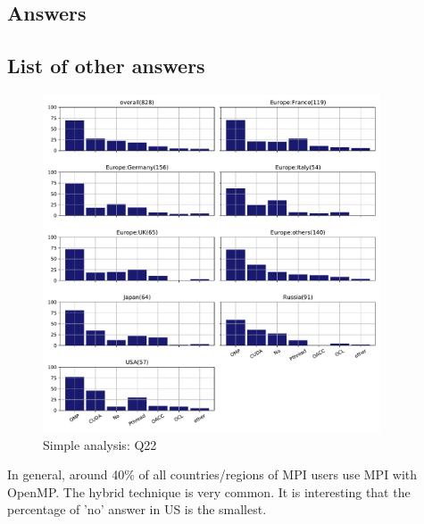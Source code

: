 
\subsection{Answers}


\subsection{List of other answers}
\begin{itemize}

\end{itemize}

\begin{figure}[htb]
\begin{center}
\includegraphics[width=10cm]{../pdfs/Q22.pdf}
\caption{Simple analysis: Q22}
\label{fig:Q22}
\end{center}
\end{figure}

In general, around 40\% of all countries/regions of MPI users
use MPI with OpenMP. The hybrid technique is very common.
It is interesting that the percentage of 'no' answer in US is the
smallest. 
